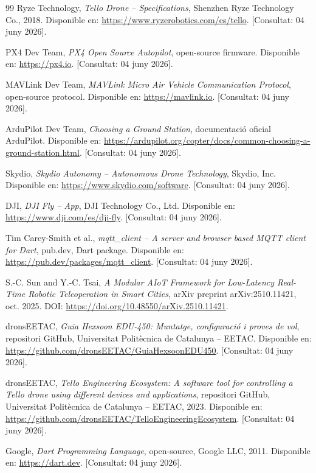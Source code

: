 \documentclass[spanish,final]{setup/eetac_tfc_pfc}
\begin{document}
\begin{thebibliography}{99}
Ryze Technology,
\textit{Tello Drone -- Specifications},
Shenzhen Ryze Technology Co., 2018.
Disponible en: \url{https://www.ryzerobotics.com/es/tello}.
[Consultat: 04 juny 2026].

PX4 Dev Team,
\textit{PX4 Open Source Autopilot},
open-source firmware.
Disponible en: \url{https://px4.io}.
[Consultat: 04 juny 2026].

MAVLink Dev Team,
\textit{MAVLink Micro Air Vehicle Communication Protocol},
open-source protocol.
Disponible en: \url{https://mavlink.io}.
[Consultat: 04 juny 2026].

ArduPilot Dev Team,
\textit{Choosing a Ground Station},
documentació oficial ArduPilot.
Disponible en: \url{https://ardupilot.org/copter/docs/common-choosing-a-ground-station.html}.
[Consultat: 04 juny 2026].


Skydio,
\textit{Skydio Autonomy -- Autonomous Drone Technology},
Skydio, Inc.
Disponible en: \url{https://www.skydio.com/software}.
[Consultat: 04 juny 2026].


DJI,
\textit{DJI Fly -- App},
DJI Technology Co., Ltd.
Disponible en: \url{https://www.dji.com/es/dji-fly}.
[Consultat: 04 juny 2026].


Tim Carey-Smith et al.,
\textit{mqtt\_client -- A server and browser based MQTT client for Dart},
pub.dev, Dart package.
Disponible en: \url{https://pub.dev/packages/mqtt_client}.
[Consultat: 04 juny 2026].


S.-C. Sun and Y.-C. Tsai,
\textit{A Modular AIoT Framework for Low-Latency Real-Time Robotic
Teleoperation in Smart Cities},
arXiv preprint arXiv:2510.11421, oct. 2025.
DOI: \url{https://doi.org/10.48550/arXiv.2510.11421}.

dronsEETAC,
\textit{Guia Hexsoon EDU-450: Muntatge, configuració i proves de vol},
repositori GitHub, Universitat Politècnica de Catalunya -- EETAC.
Disponible en: \url{https://github.com/dronsEETAC/GuiaHexsoonEDU450}.
[Consultat: 04 juny 2026].

dronsEETAC,
\textit{Tello Engineering Ecosystem: A software tool for controlling
a Tello drone using different devices and applications},
repositori GitHub, Universitat Politècnica de Catalunya -- EETAC, 2023.
Disponible en: \url{https://github.com/dronsEETAC/TelloEngineeringEcosystem}.
[Consultat: 04 juny 2026].

Google,
\textit{Dart Programming Language},
open-source, Google LLC, 2011.
Disponible en: \url{https://dart.dev}.
[Consultat: 04 juny 2026].



\end{thebibliography}
\end{document}
